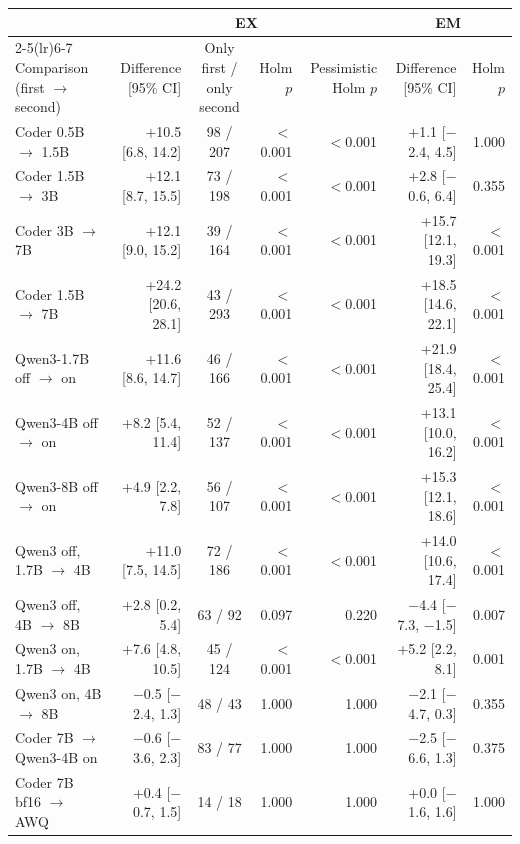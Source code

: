 \begin{tabular}{@{}l r c r r r r@{}}
\toprule
 & \multicolumn{4}{c}{EX} & \multicolumn{2}{c}{EM} \\
\cmidrule(lr){2-5}\cmidrule(lr){6-7}
Comparison (first $\to$ second) & Difference [95\% CI] & Only first / only second & Holm $p$ & Pessimistic Holm $p$ & Difference [95\% CI] & Holm $p$ \\
\midrule
Coder 0.5B $\to$ 1.5B & +10.5 [6.8, 14.2] & 98 / 207 & $<$0.001 & $<$0.001 & +1.1 [$-$2.4, 4.5] & 1.000 \\
Coder 1.5B $\to$ 3B & +12.1 [8.7, 15.5] & 73 / 198 & $<$0.001 & $<$0.001 & +2.8 [$-$0.6, 6.4] & 0.355 \\
Coder 3B $\to$ 7B & +12.1 [9.0, 15.2] & 39 / 164 & $<$0.001 & $<$0.001 & +15.7 [12.1, 19.3] & $<$0.001 \\
Coder 1.5B $\to$ 7B & +24.2 [20.6, 28.1] & 43 / 293 & $<$0.001 & $<$0.001 & +18.5 [14.6, 22.1] & $<$0.001 \\
Qwen3-1.7B off $\to$ on & +11.6 [8.6, 14.7] & 46 / 166 & $<$0.001 & $<$0.001 & +21.9 [18.4, 25.4] & $<$0.001 \\
Qwen3-4B off $\to$ on & +8.2 [5.4, 11.4] & 52 / 137 & $<$0.001 & $<$0.001 & +13.1 [10.0, 16.2] & $<$0.001 \\
Qwen3-8B off $\to$ on & +4.9 [2.2, 7.8] & 56 / 107 & $<$0.001 & $<$0.001 & +15.3 [12.1, 18.6] & $<$0.001 \\
Qwen3 off, 1.7B $\to$ 4B & +11.0 [7.5, 14.5] & 72 / 186 & $<$0.001 & $<$0.001 & +14.0 [10.6, 17.4] & $<$0.001 \\
Qwen3 off, 4B $\to$ 8B & +2.8 [0.2, 5.4] & 63 / 92 & 0.097 & 0.220 & $-$4.4 [$-$7.3, $-$1.5] & 0.007 \\
Qwen3 on, 1.7B $\to$ 4B & +7.6 [4.8, 10.5] & 45 / 124 & $<$0.001 & $<$0.001 & +5.2 [2.2, 8.1] & 0.001 \\
Qwen3 on, 4B $\to$ 8B & $-$0.5 [$-$2.4, 1.3] & 48 / 43 & 1.000 & 1.000 & $-$2.1 [$-$4.7, 0.3] & 0.355 \\
Coder 7B $\to$ Qwen3-4B on & $-$0.6 [$-$3.6, 2.3] & 83 / 77 & 1.000 & 1.000 & $-$2.5 [$-$6.6, 1.3] & 0.375 \\
Coder 7B bf16 $\to$ AWQ & +0.4 [$-$0.7, 1.5] & 14 / 18 & 1.000 & 1.000 & +0.0 [$-$1.6, 1.6] & 1.000 \\
\bottomrule
\end{tabular}
